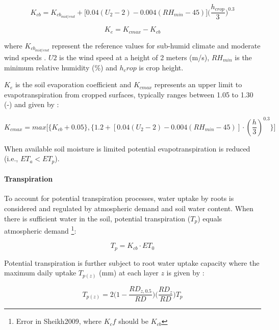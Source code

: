 \documentclass[]{article}
\let\oldparagraph\paragraph
\renewcommand{\paragraph}[1]{\oldparagraph{#1}\mbox{}}
\let\rmarkdownfootnote\footnote%
\def\footnote{\protect\rmarkdownfootnote}
\begin{document}
\begin{equation}
K_{cb}=K_{cb_{mid/end}} + \Big[ 0.04(U_2-2)-0.004(RH_{min}-45) \Big] \Big( \frac{h_{crop}}{3} \Big) ^{0.3}
\label{eq:Kcb}  
\end{equation}

\begin{equation}
K_e= K_{cmax}-K_{cb}
\label{eq:Ke}  
\end{equation}

where \(K_{cb_{mid/end}}\) represent the reference values for sub-humid
climate and moderate wind speeds \citep[see][]{Allen1998}. \(U2\) is the
wind speed at a height of 2 meters (m/s), \(RH_{min}\) is the minimum
relative humidity (\%) and \(h_crop\) is crop height.

\(K_e\) is the soil evaporation coefficient and \(K_{cmax}\) represents
an upper limit to evapotranspiration from cropped surfaces, typically
ranges between 1.05 to 1.30 (-) and given by \citep{Sheikh2009}:

\begin{equation}
K_{cmax}=max \Big[ \Big\{ K_{cb}+0.05 \Big\} , \Big\{ 1.2 + [0.04(U_2-2)-0.004(RH_{min}-45)] \cdot (\frac{h}{3})^{0.3} \Big\} \Big]
\label{eq:Kcmax}  
\end{equation}

When available soil moisture is limited potential evapotranspiration is
reduced (i.e., \(ET_a < ET_p\)).

\hypertarget{transpiration}{%
\paragraph{Transpiration}\label{transpiration}}

To account for potential transpiration processes, water uptake by roots
is considered and regulated by atmospheric demand and soil water
content. When there is sufficient water in the soil, potential
transpiration (\(T_p\)) equals atmospheric demand
\citep{Sheikh2009}\footnote{Error in Sheikh2009, where $K_{c}f$ should be $K_{cb}$}:

\begin{equation}
T_p=K_{cb} \cdot ET_0
\label{eq:Tp}  
\end{equation}

Potential transpiration is further subject to root water uptake capacity
where the maximum daily uptake \(T_{p(z)}\) (mm) at each layer \(z\) is
given by \citep{Prasad1988}:

\begin{equation}
T_{p(z)} = 2 \Big( 1- \frac{RD_{z,0.5} }{RD} \Big) \Big( \frac{RD_z}{RD} \Big) T_p
\label{eq:Tpz}  
\end{equation}
\end{document}
